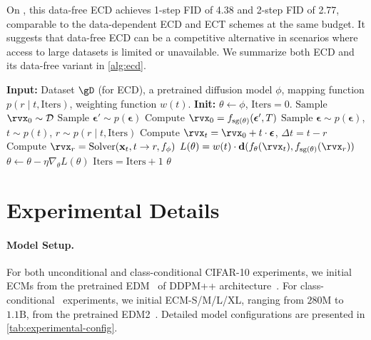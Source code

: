 On \imgnet, this data-free ECD achieves 1-step FID of 4.38 and 2-step FID of 2.77, comparable to the data-dependent ECD and ECT schemes at the same budget. It suggests that data-free ECD can be a competitive alternative in scenarios where access to large datasets is limited or unavailable.
We summarize both ECD and its data-free variant in \cref{alg:ecd}.

\vspace{5pt}
\begin{algorithm}
\caption{Easy Consistency Distillation (ECD) / Data-Free ECD}
\label{alg:ecd}
\begin{algorithmic}[t]
\State \textbf{Input:} Dataset $\gD$ (for ECD), a pretrained diffusion model $\phi$, mapping function $p(r \mid t, \mathrm{Iters})$, weighting function $w(t)$.
\State \textbf{Init:} $\theta \leftarrow \phi$, $\mathrm{Iters} = 0$.
\Repeat
{}
\State $\mathrm{Sample}$ $\x_0 \sim \mathcal{D}$
\State $\mathrm{Sample}$ $\boldsymbol{\epsilon}' \sim p(\boldsymbol{\epsilon})$
\State $\mathrm{Compute}$ $\x_0 = f_{\operatorname{sg}(\theta)}(\boldsymbol{\epsilon}', T)$ 
\EndIf
\State $\mathrm{Sample}$ $\boldsymbol{\epsilon} \sim p(\boldsymbol{\epsilon})$, $t \sim p(t)$, $r \sim p(r \mid t, \mathrm{Iters})$
\State $\mathrm{Compute}$ $\x_t = \x_0 + t \cdot \boldsymbol{\epsilon}$, $\Delta t = t-r$
\State $\mathrm{Compute}$ $\x_r = \text{Solver}(\mathbf{x}_t, t \to r, f_\phi)$
\State $L(\theta) = w(t) \cdot \dist(f_\theta(\x_t), f_{\operatorname{sg}(\theta)}(\x_r))$
\State $\theta \leftarrow \theta - \eta \nabla_\theta L(\theta)$
\State $\mathrm{Iters} = \mathrm{Iters} + 1$
\Return $\theta$ 
\end{algorithmic}
\end{algorithm}



\section{Experimental Details} \label{sec:experiment-details}

\paragraph{Model Setup.} 

For both unconditional and class-conditional CIFAR-10 experiments, we initial ECMs from the pretrained EDM~\citep{Karras2022edm} of DDPM++ architecture~\citep{scoresde}.
For class-conditional \imgnet\ experiments, we initial ECM-{S/M/L/XL}, ranging from $280\mathrm{M}$ to $1.1\mathrm{B}$, from the pretrained EDM2~\citep{Karras2024edm2}. 
%
Detailed model configurations are presented in \cref{tab:experimental-config}. 


